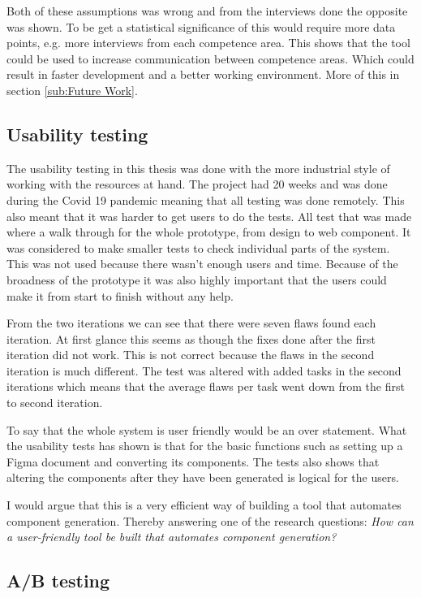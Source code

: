 Both of these assumptions was wrong and from the interviews done the opposite was shown. To be get a statistical significance of this would require more data points, e.g. more interviews from each competence area. This shows that the tool could be used to increase communication between competence areas. Which could result in faster development and a better working environment. More of this in section \ref{sub:Future Work}.

\subsection{Usability testing}%
\label{sub:Usability testing}
The usability testing in this thesis was done with the more industrial style of working with the resources at hand. The project had 20 weeks and was done during the Covid 19 pandemic meaning that all testing was done remotely. This also meant that it was harder to get users to do the tests. All test that was made where a walk through for the whole prototype, from design to web component. It was considered to make smaller tests to check individual parts of the system. This was not used because there wasn't enough users and time. Because of the broadness of the prototype it was also highly important that the users could make it from start to finish without any help. 

From the two iterations we can see that there were seven flaws found each iteration. At first glance this seems as though the fixes done after the first iteration did not work. This is not correct because the flaws in the second iteration is much different. The test was altered with added tasks in the second iterations which means that the average flaws per task went down from the first to second iteration. 

To say that the whole system is user friendly would be an over statement. What the usability tests has shown is that for the basic functions such as setting up a Figma document and converting its components. The tests also shows that altering the components after they have been generated is logical for the users. 

I would argue that this is a very efficient way of building a tool that automates component generation. Thereby answering one of the research questions: \textit{How can a user-friendly tool be built that automates component generation?}


\subsection{A/B testing}%
\label{sub:A/B testing}


